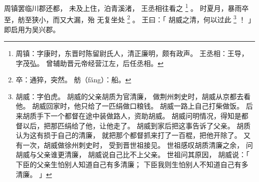
\switchcolumn*[\section{}]

周镇罢临川郡还都，
未及上住，泊青溪渚，
王丞相往看之%
\footnote{%
    周镇：字康时，东晋时陈留尉氏人，清正廉明，颇有政声。
    王丞相：王导，字茂弘。
            曾辅助晋元帝经营江左，后任丞相。
}%
。
时夏月，暴雨卒至，舫至狭小，而又大漏，殆
无复坐处%
\footnote{%
    卒：通猝，突然。
    舫（fǎng）：船。
}%
。
王曰：「
    胡威之清，何以过此%
    \footnote{%
        胡威：字伯虎。
              胡威的父亲胡质为官清廉，
              做荆州刺史时，胡威从京都去看他。
              胡威回家时，他只给了一匹绢做口粮钱。
              胡威一路上自己打柴做饭。
              后来胡质手下一个都督在途中装做路人，资助胡威。
              胡威问明情况，得知是都督以后，把那匹绢给了他，让他走了。
              胡威到家后把这事告诉了父亲。
              胡质认为这有损于自己的清廉，
              就把那个都督抓来打了一百棍，把他开除了。
              又有一次，胡威做徐州刺史时，
              受到晋世祖接见。
              世祖感叹胡质清廉之余，
              问胡威与父亲谁更清廉，
              胡威说自己比不上父亲。
              世祖问其原因，
              胡威说：「
                  下臣的父亲生怕别人知道自己有多清廉；
                  下臣我则生怕别人不知道自己有多清廉。
              」
    }%
    ！
」
即启用为吴兴郡。

\switchcolumn



